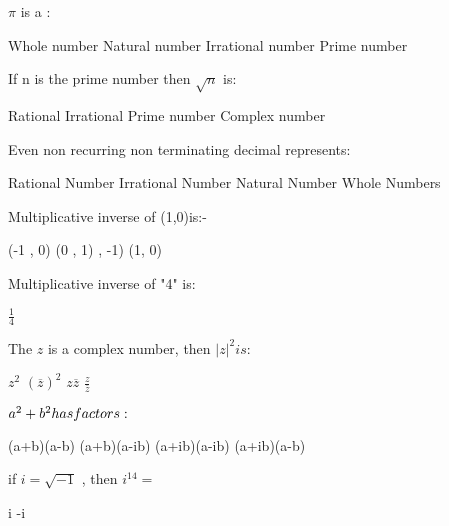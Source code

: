 \documentclass{exam}
\begin{document}
\begin{questions}
\(\pi\) is a :\\
\begin{oneparchoices}
\choice Whole number
\choice Natural number
\choice Irrational number
\choice Prime number
\end{oneparchoices}
\question 

If n is the prime number then \(\sqrt n\) is:\\
\begin{oneparchoices}
\choice Rational
\choice Irrational
\choice Prime number
\choice Complex number
\end{oneparchoices}
\question 

Even non recurring non terminating decimal represents:\\
\begin{oneparchoices}
\choice Rational Number
\choice Irrational Number
\choice Natural Number
\choice Whole Numbers
\end{oneparchoices}
\question 

Multiplicative inverse of (1,0)is:-\\
\begin{oneparchoices}
\choice (-1 , 0)
\choice (0 , 1)
 , -1)
\choice (1, 0)
\end{oneparchoices}
\question 

Multiplicative inverse of "4" is:\\
\begin{oneparchoices}
\choice \(\frac{1}{4}\)
\end{oneparchoices}
\question 

The \(z \) is a complex number, then \(\left| z\right|^{2} is: \)\\
\begin{oneparchoices}
\choice \(z^{2}\)
\choice \(\left( \overline{z} \right)^{2} \)
\choice \(z\overline{z}\)
\choice \(\frac{z}{\overline{z}}\)
\end{oneparchoices}
\question 

\(a^{2} + b^{2} \space has factors: \)\\
\begin{oneparchoices}
\choice (a+b)(a-b)
\choice (a+b)(a-ib)
\choice (a+ib)(a-ib)
\choice (a+ib)(a-b)
\end{oneparchoices}
\question 

if \(i =\sqrt{-1}\) , then \(i^{14}=\)\\
\begin{oneparchoices}
\choice i
\choice -i
\end{oneparchoices}
\question 


\end{questions}
\end{document}
